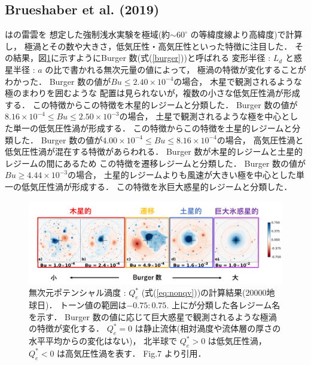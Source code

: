 \documentclass[a4j,12pt,openbib,oneside]{jreport}
\begin{document}
\subsection{Brueshaber et al. (2019)}
\label{sec:intro22}
\cite{Brueshaber2019}は\cite{Showman2007}の雷雲を
想定した強制浅水実験を極域(約$\sim 60^\circ$ の等緯度線より高緯度)で計算し，
極渦とその数や大きさ，低気圧性・高気圧性といった特徴に注目した．
その結果，図\ref{fig4}に示すようにBurger 数(式(\ref{burger}))と呼ばれる
変形半径 : $L_{d}$ と惑星半径 : $a$ の比で書かれる無次元量の値によって，
極渦の特徴が変化することがわかった．
%
Burger 数の値が$Bu \leq 2.40 \times 10^{-4}$の場合，
木星で観測されるような極のまわりを囲むような
配置は見られないが，複数の小さな低気圧性渦が形成する．
この特徴からこの特徴を木星的レジームと分類した．
%
Burger 数の値が$8.16 \times 10^{-4 } \leq Bu \leq  2.50 \times 10^{-3}$の場合，
土星で観測されるような極を中心とした単一の低気圧性渦が形成する．
この特徴からこの特徴を土星的レジームと分類した．
%
Burger 数の値が$4.00 \times 10^{-4 } \leq  Bu \leq  8.16 \times 10^{-4}$の場合，
高気圧性渦と低気圧性渦が混在する特徴があらわれる．
Burger 数が木星的レジームと土星的レジームの間にあるため
この特徴を遷移レジームと分類した．
%
Burger 数の値が$Bu \geq 4.44 \times 10^{-3 }$の場合，
土星的レジームよりも風速が大きい極を中心とした単一の低気圧性渦が形成する．
この特徴を氷巨大惑星的レジームと分類した．
%
\begin{figure}[H]
  \begin{center}
    \includegraphics[clip,width=14cm]{./fig/intro/fig4_2.png}
    \caption{
      \footnotesize{無次元ポテンシャル渦度 : $Q_e^*$ (式(\ref{eq:nonqv}))の計算結果(20000地球日)．
トーン値の範囲は$-0.75 : 0.75$.
上に\cite{Brueshaber2019}が分類した各レジーム名を示す．
Burger 数の値に応じて巨大惑星で観測されるような極渦の特徴が変化する．
$Q_e^* = 0$ は静止流体(相対渦度や流体層の厚さの水平平均からの変化はない)，
北半球で $Q_e^* > 0$ は低気圧性渦，$Q_e^* < 0$ は高気圧性渦を表す．
\cite{Brueshaber2019} Fig.7 より引用．
      }
    }
    \label{fig4}
  \end{center}
\end{figure}
%
\def\intro3{研究目的}
\end{document}

